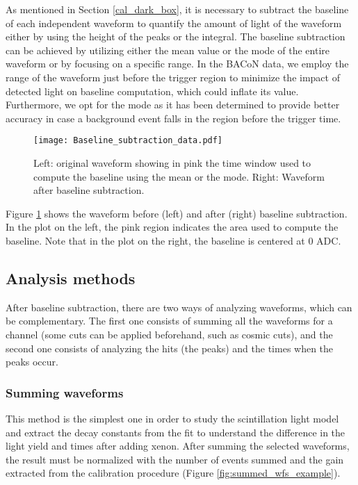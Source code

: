 \documentclass[11pt,a4paper,english,oneside, pdf]{article}
\begin{document}
	As mentioned in Section \ref{cal_dark_box}, it is necessary to subtract the baseline of each independent waveform to quantify the amount of light of the waveform either by using the height of the peaks or the integral. The baseline subtraction can be achieved by utilizing either the mean value or the mode of the entire waveform or by focusing on a specific range. In the BACoN data, we employ the range of the waveform just before the trigger region to minimize the impact of detected light on baseline computation, which could inflate its value. Furthermore, we opt for the mode as it has been determined to provide better accuracy in case a background event falls in the region before the trigger time.
	
	\begin{figure}[!h]
		\begin{center}
			\texttt{[image: Baseline\_subtraction\_data.pdf]}
			\caption{Left: original waveform showing in pink the time window used to compute the baseline using the mean or the mode. Right: Waveform after baseline subtraction.}
			\label{fig:Baseline_subtraction_data}
		\end{center}
	\end{figure}
	
	Figure \ref{fig:Baseline_subtraction_data} shows the waveform before (left) and after (right) baseline subtraction. In the plot on the left, the pink region indicates the area used to compute the baseline. Note that in the plot on the right, the baseline is centered at 0 ADC.
	
	
	\vspace{20pt}
	
	\subsection{Analysis methods}
	
	After baseline subtraction, there are two ways of analyzing waveforms, which can be complementary. The first one consists of summing all the waveforms for a channel (some cuts can be applied beforehand, such as cosmic cuts), and the second one consists of analyzing the hits (the peaks) and the times when the peaks occur.
	
	
	\subsubsection{Summing waveforms}
	
	This method is the simplest one in order to study the scintillation light model and extract the decay constants from the fit to understand the difference in the light yield and times after adding xenon. After summing the selected waveforms, the result must be normalized with the number of events summed and the gain extracted from the calibration procedure (Figure \ref{fig:summed_wfs_example}).
	
\end{document}
